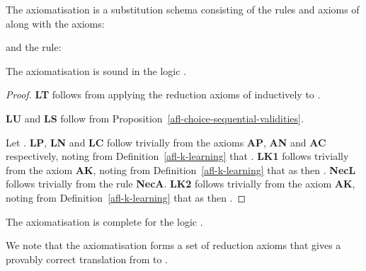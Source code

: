 \documentclass[twoside]{aiml14}
\begin{document}
  \begin{definition}\label{afl-k-axioms}
      The axiomatisation \axiomAflK{} is a substitution schema consisting of the
      rules and axioms of \axiomK{} along with the axioms:
      
      and the rule:
      
  \end{definition}

  \begin{proposition}\label{afl-k-axioms-soundness}
      The axiomatisation \axiomAflK{} is sound in the logic \logicAmlK{}.
  \end{proposition}

  \begin{proof}
      {\bf LT} follows from applying the reduction axioms of \axiomAmlK{}
      inductively to .

      {\bf LU} and {\bf LS} follow from Proposition~\ref{afl-choice-sequential-validities}.

      Let .
      {\bf LP}, {\bf LN} and {\bf LC} follow trivially from the \axiomAmlK{}
      axioms {\bf AP}, {\bf AN} and {\bf AC} respectively, noting from
      Definition~\ref{afl-k-learning} that .
      {\bf LK1} follows trivially from the \axiomAmlK{} axiom {\bf AK},
      noting from Definition~\ref{afl-k-learning} that as  then 
      .
      {\bf NecL} follows trivially from the \axiomAmlK{} rule {\bf NecA}.
      {\bf LK2} follows trivially from the \axiomAmlK{} axiom {\bf AK},
      noting from Definition~\ref{afl-k-learning} that as  then 
      .
  \end{proof}

  \begin{proposition}\label{afl-k-axioms-completeness}
      The axiomatisation \axiomAflK{} is complete for the logic \logicAmlK{}.
  \end{proposition}

  We note that the axiomatisation \axiomAflK{} forms a set of reduction axioms
  that gives a provably correct translation from \langAfl{} to \lang{}.
\end{document}
